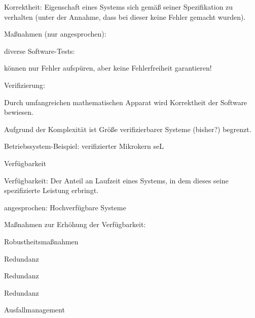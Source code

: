 \documentclass[a4paper]{article}
\begin{document}
\begin{multicols}{3}
    \begin{itemize*}
        \item
        Korrektheit: Eigenschaft eines Systems sich gemäß seiner Spezifikation
        zu verhalten (unter der Annahme, dass bei dieser keine Fehler gemacht
        wurden).
        \item
        Maßnahmen (nur angesprochen):
    \end{itemize*}

    \begin{enumerate*}
        \item
        diverse Software-Tests:
        \begin{itemize*}
            \item können nur Fehler aufspüren, aber keine Fehlerfreiheit garantieren!
        \end{itemize*}
        \item
        Verifizierung:
        \begin{itemize*}
            \item Durch umfangreichen mathematischen Apparat wird Korrektheit der Software bewiesen.
            \item Aufgrund der Komplexität ist Größe verifizierbarer Systeme (bisher?) begrenzt.
            \item Betriebssystem-Beispiel: verifizierter Mikrokern seL
        \end{itemize*}
    \end{enumerate*}

    Verfügbarkeit

    \begin{itemize*}
        \item
        Verfügbarkeit: Der Anteil an Laufzeit eines Systems, in dem dieses
        seine spezifizierte Leistung erbringt.
        \item
        angesprochen: Hochverfügbare Systeme
        \item
        Maßnahmen zur Erhöhung der Verfügbarkeit:
        \begin{enumerate*}

            \item Robustheitsmaßnahmen
            \item Redundanz
            \item Redundanz
            \item Redundanz
            \item Ausfallmanagement
        \end{enumerate*}
    \end{itemize*}



\end{multicols}
\end{document}
